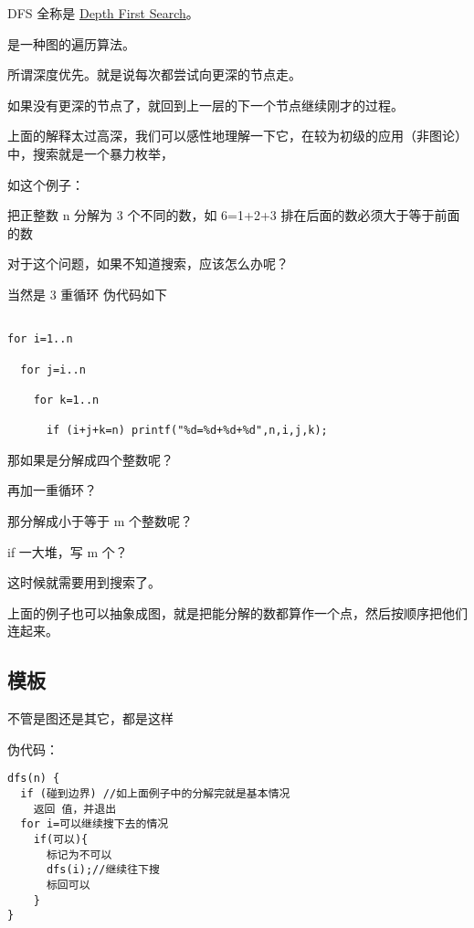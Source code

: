 
DFS 全称是 \href{https://en.wikipedia.org/wiki/Depth-first_search}{Depth First Search}。

是一种图的遍历算法。

所谓深度优先。就是说每次都尝试向更深的节点走。

如果没有更深的节点了，就回到上一层的下一个节点继续刚才的过程。

上面的解释太过高深，我们可以感性地理解一下它，在较为初级的应用（非图论）中，搜索就是一个暴力枚举，

如这个例子：

\begin{QUOTE}{}{}
把正整数 n 分解为 3 个不同的数，如 6=1+2+3 排在后面的数必须大于等于前面的数



对于这个问题，如果不知道搜索，应该怎么办呢？



当然是 3 重循环 伪代码如下



\begin{verbatim}

for i=1..n

  for j=i..n

    for k=1..n

      if (i+j+k=n) printf("%d=%d+%d+%d",n,i,j,k);

\end{verbatim}



那如果是分解成四个整数呢？



再加一重循环？
\end{QUOTE}

那分解成小于等于 m 个整数呢？

if 一大堆，写 m 个？

这时候就需要用到搜索了。

上面的例子也可以抽象成图，就是把能分解的数都算作一个点，然后按顺序把他们连起来。

\subsection{模板}

不管是图还是其它，都是这样

伪代码：

\begin{verbatim}
dfs(n) {
  if (碰到边界) //如上面例子中的分解完就是基本情况
    返回 值，并退出
  for i=可以继续搜下去的情况
    if(可以){
      标记为不可以
      dfs(i);//继续往下搜
      标回可以
    }
}
\end{verbatim}

